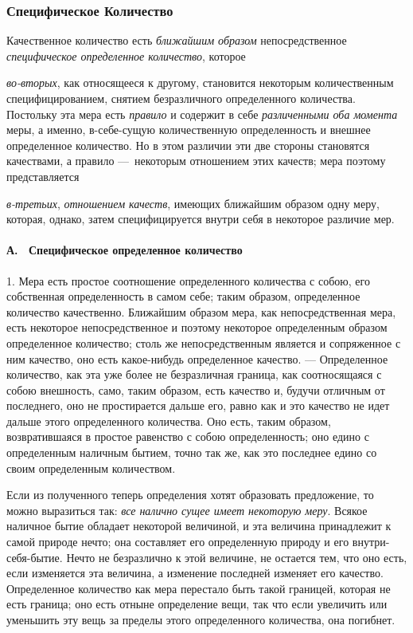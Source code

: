 \subsubsection[Первая главаСпецифическое
Количество]{\newline
Специфическое Количество}
\hypertarget{Toc478978671}{}Качественное количество есть
{\em ближайшим образом} непосредственное
{\em специфическое определенное количество}, которое

{\em во-вторых}, как относящееся к другому, становится
некоторым количественным специфицированием, снятием безразличного
определенного количества. Постольку эта мера есть
{\em правило} и содержит в себе
{\em различенными оба момента} меры, а именно,
в-себе-сущую количественную определенность и внешнее определенное
количество. Но в этом различии эти две стороны становятся качествами, а
правило —~некоторым отношением этих качеств; мера поэтому представляется

{\em в-третьих}, {\em отношением
качеств}, имеющих ближайшим образом одну меру, которая, однако, затем
специфицируется внутри себя в некоторое различие мер.

\paragraph[А. \ Специфическое определенное количество]{А. \ Специфическое
определенное количество}
\hypertarget{Toc478978672}{}1. Мера есть простое соотношение определенного
количества с собою, его собственная определенность в самом себе; таким
образом, определенное количество качественно. Ближайшим образом мера, как
непосредственная мера, есть некоторое непосредственное и поэтому некоторое
определенным образом определенное количество; столь же непосредственным
является и сопряженное с ним качество, оно есть какое-нибудь определенное
качество. — Определенное количество, как эта уже более не безразличная
граница, как соотносящаяся с собою внешность, само, таким образом, есть
качество и, будучи отличным от последнего, оно не простирается дальше его,
равно как и это качество не идет дальше этого определенного количества. Оно
есть, таким образом, возвратившаяся в простое равенство с собою
определенность; оно едино с определенным наличным бытием, точно так же, как
это последнее едино со своим определенным количеством.

Если из полученного теперь определения хотят образовать предложение, то
можно выразиться так: {\em все налично сущее имеет
некоторую меру}. Всякое наличное бытие обладает некоторой величиной, и эта
величина принадлежит к самой природе нечто; она составляет его определенную
природу и его внутри-себя-бытие. Нечто не безразлично к этой величине, не
остается тем, что оно есть, если изменяется эта величина, а изменение
последней изменяет его качество. Определенное количество как мера перестало
быть такой границей, которая не есть граница; оно есть отныне определение
вещи, так что если увеличить или уменьшить эту вещь за пределы этого
определенного количества, она погибнет.

